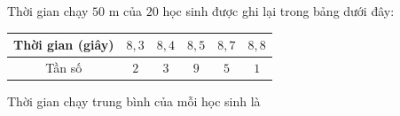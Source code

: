 \begin{ex}
Thời gian chạy $50$ m của $20$ học sinh được ghi lại trong bảng dưới đây:
\begin{center}
\begin{tabular}{|c|c|c|c|c|c|}\hline
Thời gian (giây) & $8{,}3$ & $8{,}4$ & $8{,}5$ & $8{,}7$ & $8{,}8$\\\hline
Tần số & $2$ & $3$ & $9$ & $5$ & $1$\\\hline
\end{tabular}
\end{center}
Thời gian chạy trung bình của mỗi học sinh là
\end{ex}
